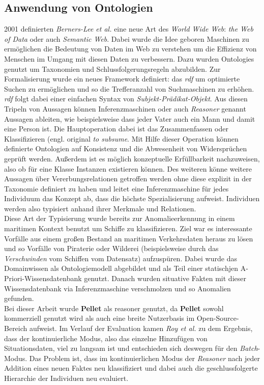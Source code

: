 \subsection{Anwendung von Ontologien}
2001 definierten \textit{Berners-Lee et al.}\cite{berners2001semantic} eine neue Art des \textit{World Wide Web}: \textit{the Web of Data} oder auch \textit{Semantic Web}. Dabei wurde die Idee geboren Maschinen zu ermöglichen die Bedeutung von Daten im Web zu verstehen um die Effizienz von Menschen im Umgang mit diesen Daten zu verbessern\cite{lasi2014industry}. Dazu wurden \Glspl{Ontologie} genutzt um Taxonomien und Schlussfolgerungsregeln abzubilden. Zur Formalisierung wurde ein neues Framework definiert: das \textit{\Gls{rdf}} um optimierte Suchen zu ermöglichen und so die Trefferanzahl von Suchmaschinen zu erhöhen\cite{feilmayr2016analysis}. \textit{\Gls{rdf}} folgt dabei einer einfachen Syntax von \textit{Subjekt-Prädikat-Objekt}. Aus diesen Tripeln von Aussagen können Inferenzmaschinen oder auch \textit{Reasoner} genannt Aussagen ableiten, wie beispielsweise dass jeder Vater auch ein Mann und damit eine Person ist\cite{roy2010exploitation}. Die Hauptoperation dabei ist das Zusammenfassen oder Klassifizieren (engl. original \textit{to subsume}. Mit Hilfe dieser Operation können definierte Ontologien auf Konsistenz und die Abwesenheit von Widersprüchen geprüft werden. Außerdem ist es möglich konzeptuelle Erfüllbarkeit nachzuweisen, also ob für eine Klasse Instanzen existieren können. Des weiteren könne weitere Aussagen über Vererbungsrelationen getroffen werden ohne diese explizit in der Taxonomie definiert zu haben und leitet eine Inferenzmaschine für jedes Individuum das Konzept ab, dass die höchste Spezialisierung aufweist. Individuen werden also typisiert anhand ihrer Merkmale und Relationen\cite{roy2010exploitation}.\\
Diese Art der Typisierung wurde bereits zur Anomalieerkennung in einem maritimen Kontext benutzt um Schiffe zu klassifizieren. Ziel war es interessante Vorfälle aus einem großen Bestand an maritimen Verkehrsdaten heraus zu lösen und so Vorfälle von Piraterie oder Wilderei (beispielsweise durch das \textit{Verschwinden} vom Schiffen vom Datensatz) aufzuspüren\cite{roy2010exploitation}. Dabei wurde das Domainwissen als Ontologiemodell abgebildet und als Teil einer statischjen A-Priori-Wissensdatenbank genutzt. Danach wurden situative Fakten mit dieser Wissensdatenbank via Inferenzmaschine verschmolzen und so Anomalien gefunden.\\
Bei dieser Arbeit wurde \textbf{Pellet}\cite{pellet} als \Gls{reasoner} genutzt, da \textbf{Pellet} sowohl kommerziell genutzt wird als auch eine breite Nutzerbasis im Open-Source-Bereich aufweist. Im Verlauf der Evaluation kamen \textit{Roy et al.} zu dem Ergebnis, dass der kontinuierliche Modus, also das einzelne Hinzufügen von Situationsdaten, viel zu langsam ist und entschieden sich deswegen für den \textit{Batch}-Modus. Das Problem ist, dass im kontinuierlichen Modus der \textit{Reasoner} nach jeder Addition eines neuen Faktes neu klassifiziert und dabei auch die geschlussfolgerte Hierarchie der Individuen neu evaluiert\cite[p.~4]{roy2010exploitation}.\\